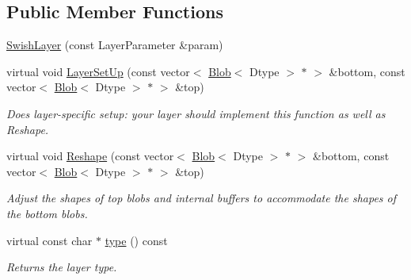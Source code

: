 \subsection*{Public Member Functions}
\begin{DoxyCompactItemize}
\item 
\hyperlink{classcaffe_1_1SwishLayer_afd59cd91314ef60acef0d3ba80500818}{Swish\+Layer} (const Layer\+Parameter \&param)
\item 
virtual void \hyperlink{classcaffe_1_1SwishLayer_a07ce69f7855f0374ad826fb59fc58712}{Layer\+Set\+Up} (const vector$<$ \hyperlink{classcaffe_1_1Blob}{Blob}$<$ Dtype $>$ $\ast$ $>$ \&bottom, const vector$<$ \hyperlink{classcaffe_1_1Blob}{Blob}$<$ Dtype $>$ $\ast$ $>$ \&top)
\begin{DoxyCompactList}\small\item\em Does layer-\/specific setup\+: your layer should implement this function as well as Reshape. \end{DoxyCompactList}\item 
virtual void \hyperlink{classcaffe_1_1SwishLayer_a06173b1a0bdc7df0a21535a1fc0cf2a9}{Reshape} (const vector$<$ \hyperlink{classcaffe_1_1Blob}{Blob}$<$ Dtype $>$ $\ast$ $>$ \&bottom, const vector$<$ \hyperlink{classcaffe_1_1Blob}{Blob}$<$ Dtype $>$ $\ast$ $>$ \&top)
\begin{DoxyCompactList}\small\item\em Adjust the shapes of top blobs and internal buffers to accommodate the shapes of the bottom blobs. \end{DoxyCompactList}\item 
virtual const char $\ast$ \hyperlink{classcaffe_1_1SwishLayer_a8f031a11b307fe5d20d20c172c390b77}{type} () const \hypertarget{classcaffe_1_1SwishLayer_a8f031a11b307fe5d20d20c172c390b77}{}\label{classcaffe_1_1SwishLayer_a8f031a11b307fe5d20d20c172c390b77}

\begin{DoxyCompactList}\small\item\em Returns the layer type. \end{DoxyCompactList}\end{DoxyCompactItemize}
